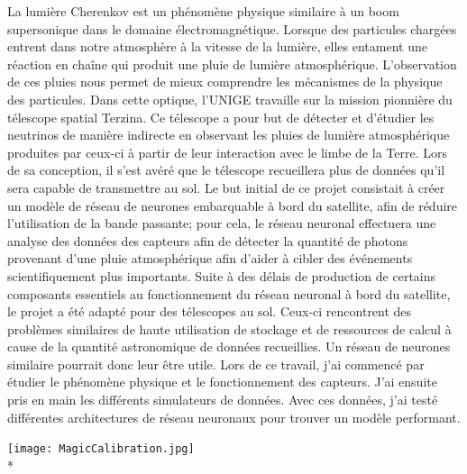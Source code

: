 \begin{spacing}{0.956}
\vspace{0.5cm}

La lumière Cherenkov est un phénomène physique similaire à un boom supersonique dans le domaine électromagnétique.
Lorsque des particules chargées entrent dans notre atmosphère à la vitesse de la lumière, 
elles entament une réaction en chaîne qui produit une pluie de lumière atmosphérique.
L’observation de ces pluies nous permet de mieux comprendre les mécanismes de la physique des particules. 
Dans cette optique, l’UNIGE travaille sur la mission pionnière du télescope spatial Terzina. 
Ce télescope a pour but de détecter et d’étudier les neutrinos de manière indirecte en observant les pluies de lumière atmosphérique
produites par ceux-ci à partir de leur interaction avec le limbe de la Terre. Lors de sa conception, il s'est avéré 
que le télescope recueillera plus de données qu'il sera capable de transmettre au sol.
Le but initial de ce projet consistait à créer un modèle de réseau de neurones embarquable à bord du satellite,
afin de réduire l'utilisation de la bande passante; pour cela, le réseau neuronal effectuera une analyse des données des capteurs
afin de détecter la quantité de photons provenant d'une pluie atmosphérique afin d'aider à cibler des événements scientifiquement plus importants.  
Suite à des délais de production de certains composants essentiels au fonctionnement du réseau neuronal à bord du satellite,
le projet a été adapté pour des télescopes au sol. Ceux-ci rencontrent des problèmes similaires de haute utilisation 
de stockage et de ressources de calcul à cause de la quantité astronomique de données recueillies.
Un réseau de neurones similaire pourrait donc leur être utile.
Lors de ce travail, j'ai commencé par étudier le phénomène physique et le fonctionnement des capteurs. 
J'ai ensuite pris en main les différents simulateurs de données. 
Avec ces données, j'ai testé différentes architectures de réseau neuronaux pour trouver un modèle performant.

\vfill
\begin{center}
	{\texttt{[image: MagicCalibration.jpg]}}\\*
\vfill


\end{center}
\end{spacing}
